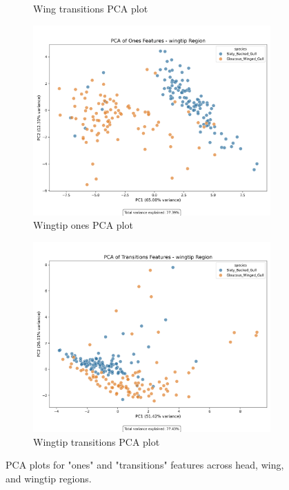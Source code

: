 \documentclass[a4paper,12pt]{report}
\begin{document}
\begin{figure}[H]
\begin{subfigure}[b]{0.48\textwidth}
        \caption{Wing transitions PCA plot}
    \end{subfigure}
    \vspace{0.5cm}
    \begin{subfigure}[b]{0.48\textwidth}
        \includegraphics[width=\textwidth]{images/appendix/Original/pca/wingtip_ones_pca_plot.png}
        \caption{Wingtip ones PCA plot}
    \end{subfigure}
    \hfill
    \begin{subfigure}[b]{0.48\textwidth}
        \includegraphics[width=\textwidth]{images/appendix/Original/pca/wingtip_transitions_pca_plot.png}
        \caption{Wingtip transitions PCA plot}
    \end{subfigure}
    \caption{PCA plots for "ones" and "transitions" features across head, wing, and wingtip regions.}
\end{figure}
\end{document}
